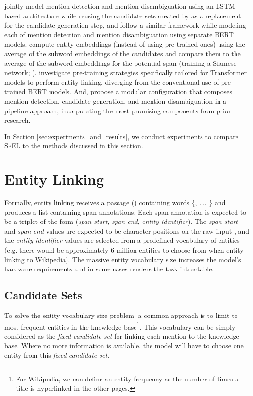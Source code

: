 \documentclass[11pt]{article}
\begin{document}
\citet{K18-1050} jointly model mention detection and mention disambiguation using an LSTM-based architecture while reusing the candidate sets created by \citet{D17-1277} as a replacement for the candidate generation step, and \citet{CHOLAN} follow a similar framework while modeling each of mention detection and mention disambiguation using separate BERT models. \citet{2022.findings-aacl.1} compute entity embeddings (instead of using pre-trained ones) using the average of the subword embeddings of the candidates and compare them to the average of the subword embeddings for the potential span (training a Siamese network; \citealp{SiameseNetwork}). \citet{AKBC2020} investigate pre-training strategies specifically tailored for Transformer models to perform entity linking, diverging from the conventional use of pre-trained BERT models. And, \citet{REL_EL} propose a modular configuration that composes mention detection, candidate generation, and mention disambiguation in a pipeline approach, incorporating the most promising components from prior research. 

In Section \ref{sec:experiments_and_results}, we conduct experiments to compare \textsc{SpEL} to the methods discussed in this section.


\section{Entity Linking}\label{sec:entity_linking}
Formally, entity linking receives a passage () containing words \{, ..., \} and produces a list containing  span annotations. Each span annotation is expected to be a triplet of the form (\textit{span start}, \textit{span end}, \textit{entity identifier}).
The \textit{span start} and \textit{span end} values are expected to be character positions on the raw input , and the \textit{entity identifier} values are selected from a predefined vocabulary of entities (e.g. there would be approximately 6 million entities to choose from when entity linking to Wikipedia). The massive entity vocabulary size increases the model's hardware requirements and in some cases renders the task intractable. 

\subsection{Candidate Sets}\label{sec:candidateset}
To solve the entity vocabulary size problem, a common approach is to limit to  most frequent entities in the knowledge base\footnote{For Wikipedia, we can define an entity frequency as the number of times a title is hyperlinked in the other pages.}. This vocabulary can be simply considered as the \textit{fixed candidate set} for linking each mention to the knowledge base. Where no more information is available, the model will have to choose one entity from this \textit{fixed candidate set}. 
\end{document}
